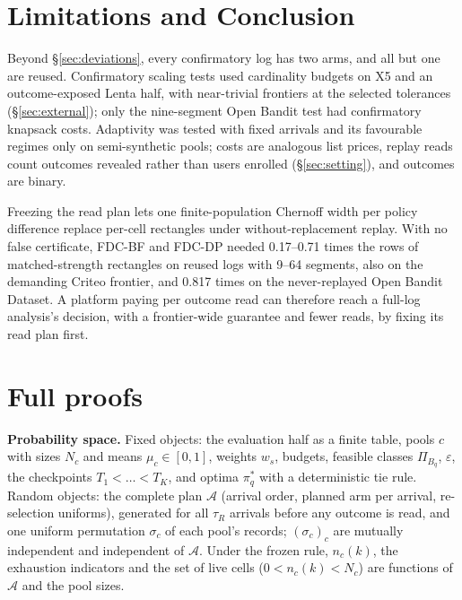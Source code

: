 \documentclass[sigconf,anonymous,review]{acmart}
\newcommand{\cA}{\mathcal{A}}
\newcommand{\eps}{\varepsilon}
\begin{document}
\section{Limitations and Conclusion}\label{sec:conclusion}

Beyond \S\ref{sec:deviations}, every confirmatory log has two arms, and all but one are reused. Confirmatory scaling tests used cardinality budgets on X5 and an outcome-exposed Lenta half, with near-trivial frontiers at the selected tolerances (\S\ref{sec:external}); only the nine-segment Open Bandit test had confirmatory knapsack costs. Adaptivity was tested with fixed arrivals and its favourable regimes only on semi-synthetic pools; costs are analogous list prices, replay reads count outcomes revealed rather than users enrolled (\S\ref{sec:setting}), and outcomes are binary.

Freezing the read plan lets one finite-population Chernoff width per policy difference replace per-cell rectangles under without-replacement replay. With no false certificate, FDC-BF and FDC-DP needed 0.17--0.71 times the rows of matched-strength rectangles on reused logs with 9--64 segments, also on the demanding Criteo frontier, and 0.817 times on the never-replayed Open Bandit Dataset. A platform paying per outcome read can therefore reach a full-log analysis's decision, with a frontier-wide guarantee and fewer reads, by fixing its read plan first.




\appendix
\setcounter{table}{0}
\renewcommand{\thetable}{A\arabic{table}}
\setcounter{figure}{0}
\renewcommand{\thefigure}{A\arabic{figure}}

\section{Full proofs}\label{app:proofs}

\textbf{Probability space.} Fixed objects: the evaluation half as a finite table, pools $c$ with sizes $N_c$ and means $\mu_c \in [0,1]$, weights $w_s$, budgets, feasible classes $\Pi_{B_q}$, $\eps$, the checkpoints $T_1 < \dots < T_K$, and optima $\pi^*_q$ with a deterministic tie rule. Random objects: the complete plan $\cA$ (arrival order, planned arm per arrival, re-selection uniforms), generated for all $\tau_R$ arrivals before any outcome is read, and one uniform permutation $\sigma_c$ of each pool's records; $(\sigma_c)_c$ are mutually independent and independent of $\cA$. Under the frozen rule, $n_c(k)$, the exhaustion indicators and the set of live cells ($0 < n_c(k) < N_c$) are functions of $\cA$ and the pool sizes.
\end{document}
